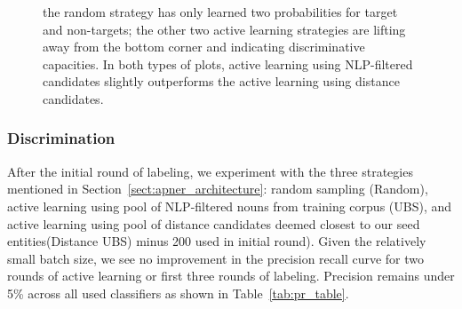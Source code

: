 \begin{figure}
{the random strategy has only learned two probabilities for target and non-targets; the other two active learning strategies are lifting away from the bottom corner and indicating discriminative capacities.
In both types of plots, active learning using NLP-filtered candidates slightly outperforms the active learning using distance candidates.
}\label{fig:rocs_prcs_round5}
\end{figure}

\subsubsection{Discrimination}
After the initial round of labeling, we experiment with the three strategies mentioned in Section~\ref{sect:apner_architecture}: random sampling (Random), active learning using pool of NLP-filtered nouns from training corpus (UBS), and active learning using pool of  distance candidates deemed closest to our seed entities(Distance UBS) \textemdash minus 200 used in initial round).
Given the relatively small batch size, we see no improvement in the precision recall curve for two rounds of active learning or first three rounds of labeling. 
Precision remains under 5\% across all used classifiers as shown in Table~\ref{tab:pr_table}. 

